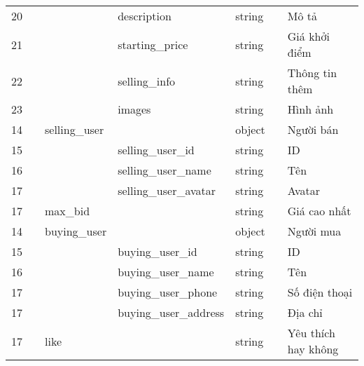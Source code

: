 \documentclass[../DoAn.tex]{subfiles}
\begin{document}
\begin{supertabular}{| p{.05\textwidth} | p{.06\textwidth}| p{.14\textwidth} | p{.25\textwidth} |p{.10\textwidth} | p{.03\textwidth}| p{.19\textwidth} |  }
    20  &  &  & description & string & & Mô tả\\
    21  &  &  & starting\_price & string & & Giá khởi điểm\\
    22  &  &  & selling\_info & string & & Thông tin thêm\\
    23  &  &  & images & string & & Hình ảnh\\
    14  &  & selling\_user &  & object & & Người bán\\
    15  &  &  & selling\_user\_id & string & & ID\\
    16  &  &  & selling\_user\_name & string & & Tên\\
    17  &  &  & selling\_user\_avatar & string & & Avatar\\
    17  &  & max\_bid & &string& & Giá cao nhất\\
    14  &  & buying\_user &  & object & & Người mua\\
    15  &  &  & buying\_user\_id & string & & ID\\
    16  &  &  & buying\_user\_name & string & & Tên\\
    17  &  &  & buying\_user\_phone & string & & Số điện thoại\\
    17  &  &  & buying\_user\_address & string & & Địa chỉ\\
    17  &  & like &  &string & & Yêu thích hay không\\\hline
    \end{supertabular}
\\
    \tabletail{\hline}
    \label{banga10}
\end{document}

